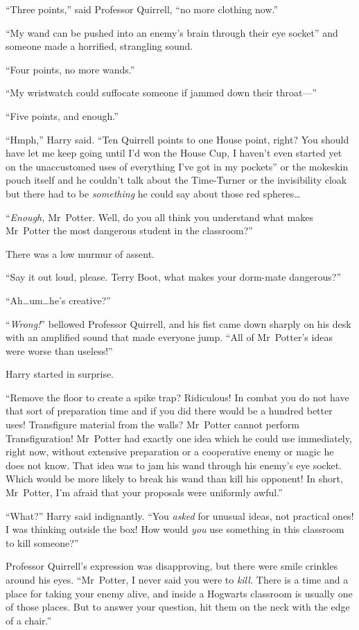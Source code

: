 “Three points,” said Professor Quirrell, “no more clothing now.”

“My wand can be pushed into an enemy’s brain through their eye socket” and someone made a horrified, strangling sound.

“Four points, no more wands.”

“My wristwatch could suffocate someone if jammed down their throat—”

“Five points, and enough.”

“Hmph,” Harry said. “Ten Quirrell points to one House point, right? You should have let me keep going until I’d won the House Cup, I haven’t even started yet on the unaccustomed uses of everything I’ve got in my pockets” or the mokeskin pouch itself and he couldn’t talk about the Time-Turner or the invisibility cloak but there had to be \emph{something} he could say about those red spheres…

“\emph{Enough,} Mr~Potter. Well, do you all think you understand what makes Mr~Potter the most dangerous student in the classroom?”

There was a low murmur of assent.

“Say it out loud, please. Terry Boot, what makes your dorm-mate dangerous?”

“Ah…um…he’s creative?”

“\emph{Wrong!}” bellowed Professor Quirrell, and his fist came down sharply on his desk with an amplified sound that made everyone jump. “All of Mr~Potter’s ideas were worse than useless!”

Harry started in surprise.

“Remove the floor to create a spike trap? Ridiculous! In combat you do not have that sort of preparation time and if you did there would be a hundred better uses! Transfigure material from the walls? Mr~Potter cannot perform Transfiguration! Mr~Potter had exactly one idea which he could use immediately, right now, without extensive preparation or a cooperative enemy or magic he does not know. That idea was to jam his wand through his enemy’s eye socket. Which would be more likely to break his wand than kill his opponent! In short, Mr~Potter, I’m afraid that your proposals were uniformly awful.”

“What?” Harry said indignantly. “You \emph{asked} for unusual ideas, not practical ones! I was thinking outside the box! How would \emph{you} use something in this classroom to kill someone?”

Professor Quirrell’s expression was disapproving, but there were smile crinkles around his eyes. “Mr~Potter, I never said you were to \emph{kill.} There is a time and a place for taking your enemy alive, and inside a Hogwarts classroom is usually one of those places. But to answer your question, hit them on the neck with the edge of a chair.”

